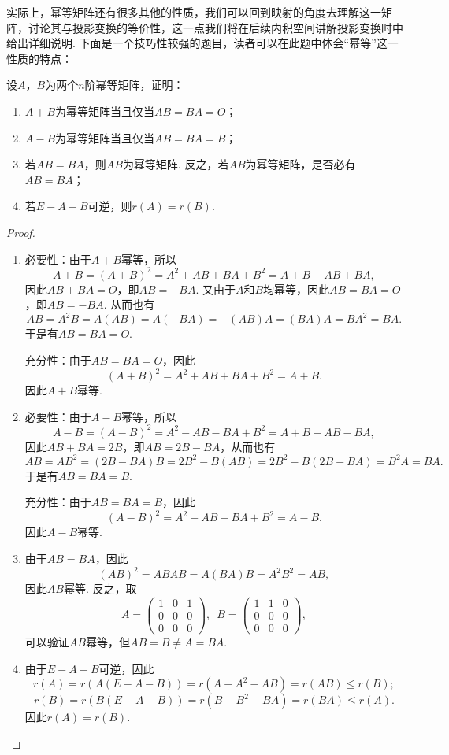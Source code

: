 实际上，幂等矩阵还有很多其他的性质，我们可以回到映射的角度去理解这一矩阵，讨论其与投影变换的等价性，这一点我们将在后续内积空间讲解投影变换时中给出详细说明. 下面是一个技巧性较强的题目，读者可以在此题中体会``幂等''这一性质的特点：
\begin{example}
    设$A$，$B$为两个$n$阶幂等矩阵，证明：
    \begin{enumerate}
        \item $A+B$为幂等矩阵当且仅当$AB=BA=O$；

        \item $A-B$为幂等矩阵当且仅当$AB=BA=B$；

        \item 若$AB=BA$，则$AB$为幂等矩阵. 反之，若$AB$为幂等矩阵，是否必有$AB=BA$；

        \item 若$E-A-B$可逆，则$r(A)=r(B)$.
    \end{enumerate}
\end{example}

\begin{proof}
    \begin{enumerate}
        \item 必要性：由于$A+B$幂等，所以
              \[A+B=(A+B)^2=A^2+AB+BA+B^2=A+B+AB+BA,\]
              因此$AB+BA=O$，即$AB=-BA$. 又由于$A$和$B$均幂等，因此$AB=BA=O$，即$AB=-BA$. 从而也有
              \[AB=A^2B=A(AB)=A(-BA)=-(AB)A=(BA)A=BA^2=BA.\]
              于是有$AB=BA=O$.

              充分性：由于$AB=BA=O$，因此
              \[(A+B)^2=A^2+AB+BA+B^2=A+B.\]
              因此$A+B$幂等.

        \item 必要性：由于$A-B$幂等，所以
              \[A-B=(A-B)^2=A^2-AB-BA+B^2=A+B-AB-BA,\]
              因此$AB+BA=2B$，即$AB=2B-BA$，从而也有
              \[AB=AB^2=(2B-BA)B=2B^2-B(AB)=2B^2-B(2B-BA)=B^2A=BA.\]
              于是有$AB=BA=B$.

              充分性：由于$AB=BA=B$，因此
              \[(A-B)^2=A^2-AB-BA+B^2=A-B.\]
              因此$A-B$幂等.

        \item 由于$AB=BA$，因此
              \[(AB)^2=ABAB=A(BA)B=A^2B^2=AB,\]
              因此$AB$幂等. 反之，取
              \[A=\begin{pmatrix}
                      1 & 0 & 1 \\ 0 & 0 & 0 \\ 0 & 0 & 0
                  \end{pmatrix},\enspace B=\begin{pmatrix}
                      1 & 1 & 0 \\ 0 & 0 & 0 \\ 0 & 0 & 0
                  \end{pmatrix},\]
              可以验证$AB$幂等，但$AB=B\neq A=BA$.

        \item 由于$E-A-B$可逆，因此
              \[r(A)=r(A(E-A-B))=r(A-A^2-AB)=r(AB)\leqslant r(B);\]
              \[r(B)=r(B(E-A-B))=r(B-B^2-BA)=r(BA)\leqslant r(A).\]
              因此$r(A)=r(B)$.
    \end{enumerate}
\end{proof}

